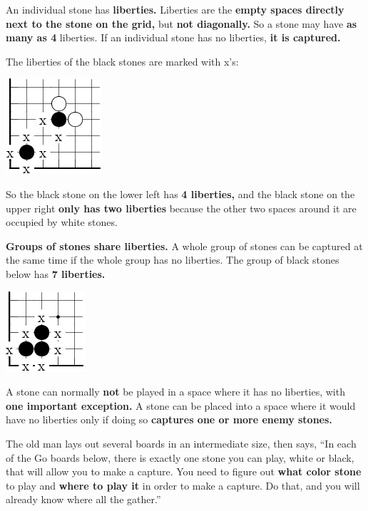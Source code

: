 An individual stone has \textbf{liberties.} Liberties are the \textbf{empty
  spaces directly next to the stone on the grid,} but \textbf{not diagonally.}
So a stone may have \textbf{as many as 4} liberties. If an individual stone has
no liberties, \textbf{it is captured.}

The liberties of the black stones are marked with x's:

\begin{center}
  \includegraphics{gogetem/assets/explanation3-crop}
\end{center}

So the black stone on the lower left has \textbf{4 liberties,} and the black
stone on the upper right \textbf{only has two liberties} because the other two
spaces around it are occupied by white stones.

\textbf{Groups of stones share liberties.} A whole group of stones can be
captured at the same time if the whole group has no liberties. The group of
black stones below has \textbf{7 liberties.}

\begin{center}
  \includegraphics{gogetem/assets/explanation4-crop}
\end{center}

A stone can normally \textbf{not} be played in a space where it has no
liberties, with \textbf{one important exception.} A stone can be placed into a
space where it would have no liberties only if doing so \textbf{captures one or
  more enemy stones.}

The old man lays out several boards in an intermediate size, then says, ``In
each of the Go boards below, there is exactly one stone you can play, white or
black, that will allow you to make a capture. You need to figure out
\textbf{what color stone} to play and \textbf{where to play it} in order to make
a capture. Do that, and you will already know where all the \mappMobimon{}
gather.''

